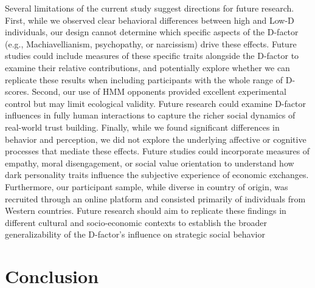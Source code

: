 \documentclass[
]{article}
\begin{document}
Several limitations of the current study suggest directions for future research. First, while we observed clear behavioral differences between high and Low-D individuals, our design cannot determine which specific aspects of the D-factor (e.g., Machiavellianism, psychopathy, or narcissism) drive these effects. Future studies could include measures of these specific traits alongside the D-factor to examine their relative contributions, and potentially explore whether we can replicate these results when including participants with the whole range of D-scores.
Second, our use of HMM opponents provided excellent experimental control but may limit ecological validity. Future research could examine D-factor influences in fully human interactions to capture the richer social dynamics of real-world trust building.
Finally, while we found significant differences in behavior and perception, we did not explore the underlying affective or cognitive processes that mediate these effects. Future studies could incorporate measures of empathy, moral disengagement, or social value orientation to understand how dark personality traits influence the subjective experience of economic exchanges. Furthermore, our participant sample, while diverse in country of origin, was recruited through an online platform and consisted primarily of individuals from Western countries. Future research should aim to replicate these findings in different cultural and socio-economic contexts to establish the broader generalizability of the D-factor's influence on strategic social behavior

\section{Conclusion}\label{conclusion}
\end{document}
